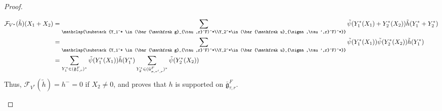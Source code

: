 \documentclass[11 pt]{article}
\numberwithin{equation}{subsection}
\theoremstyle{definition}
\theoremstyle{remark}
\theoremstyle{conjecture}
\newcommand{\bg}{\bar{\mathfrak g}}
\newcommand{\bu}{\bar{\mathfrak u}}
\newcommand{\mcF}{\mathcal F}
\begin{document}
\begin{proof}
\begin{itemize}
\begin{align*}
        \mcF_{V^*}(\tilde h)(X_1+X_2)&= \sum_{\mathclap{\substack{Y_1^* \in (\bg_{\tau,r}^F)^*\\Y_2^*\in (\bu_{\sigma,\tau',r}^F)^*}}} \Tilde{\psi}(Y_1^*(X_1)+Y_2^*(X_2))\tilde h(Y_1^*+Y_2^*)\\
        &=\sum_{\mathclap{\substack{Y_1^* \in (\bg_{\tau,r}^F)^*\\Y_2^*\in (\bu_{\sigma,\tau',r}^F)^*}}} \Tilde{\psi}(Y_1^*(X_1))\Tilde{\psi}(Y_2^*(X_2))\tilde h(Y_1^*)\\
        &=\sum_{Y_1^* \in (\bg_{\tau,r}^F)^*} \Tilde{\psi}(Y_1^*(X_1))\tilde h(Y_1^*) \sum_{Y_2^*\in (\bu_{\sigma,\tau',r}^F)^*}\Tilde{\psi}(Y_2^*(X_2))
    \end{align*}
Thus, $\mcF_{V^*}(\tilde h)=h^-=0$ if $X_2\neq 0$, and proves that $h$ is supported on $\bg_{\tau,r}^F$. 
    \end{itemize}
\end{proof}
\end{document}
